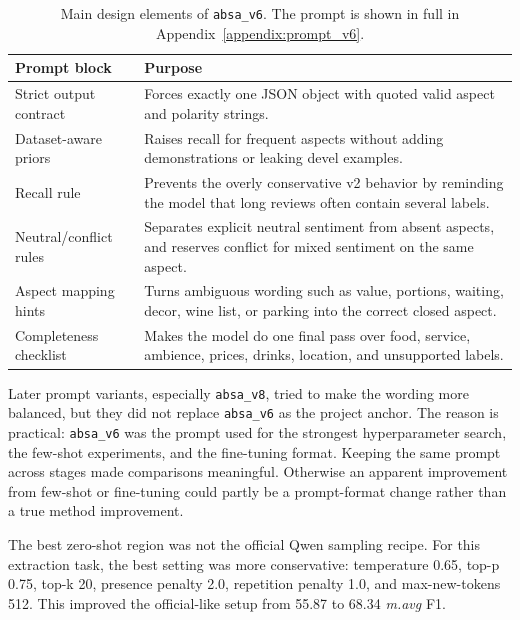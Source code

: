 \documentclass[11pt,a4paper]{article}
\newcommand{\mavg}{\textit{m.avg}}
\newcommand{\code}[1]{\texttt{#1}}
\begin{document}
\begin{table}[H]
    \centering
    \small
    \setlength{\tabcolsep}{4pt}
    \caption{Main design elements of \code{absa\_v6}. The prompt is shown in full in Appendix~\ref{appendix:prompt_v6}.}
    \label{tab:prompt_v6_design}
    \begin{tabularx}{\textwidth}{@{}lX@{}}
        \toprule
        Prompt block & Purpose \\
        \midrule
        Strict output contract & Forces exactly one JSON object with quoted valid aspect and polarity strings. \\
        Dataset-aware priors & Raises recall for frequent aspects without adding demonstrations or leaking devel examples. \\
        Recall rule & Prevents the overly conservative v2 behavior by reminding the model that long reviews often contain several labels. \\
        Neutral/conflict rules & Separates explicit neutral sentiment from absent aspects, and reserves conflict for mixed sentiment on the same aspect. \\
        Aspect mapping hints & Turns ambiguous wording such as value, portions, waiting, decor, wine list, or parking into the correct closed aspect. \\
        Completeness checklist & Makes the model do one final pass over food, service, ambience, prices, drinks, location, and unsupported labels. \\
        \bottomrule
    \end{tabularx}
\end{table}

Later prompt variants, especially \code{absa\_v8}, tried to make the wording more balanced, but they did not replace \code{absa\_v6} as the project anchor. The reason is practical: \code{absa\_v6} was the prompt used for the strongest hyperparameter search, the few-shot experiments, and the fine-tuning format. Keeping the same prompt across stages made comparisons meaningful. Otherwise an apparent improvement from few-shot or fine-tuning could partly be a prompt-format change rather than a true method improvement.

The best zero-shot region was not the official Qwen sampling recipe. For this extraction task, the best setting was more conservative: temperature 0.65, top-p 0.75, top-k 20, presence penalty 2.0, repetition penalty 1.0, and max-new-tokens 512. This improved the official-like setup from 55.87 to 68.34 \mavg{} F1.
\end{document}
